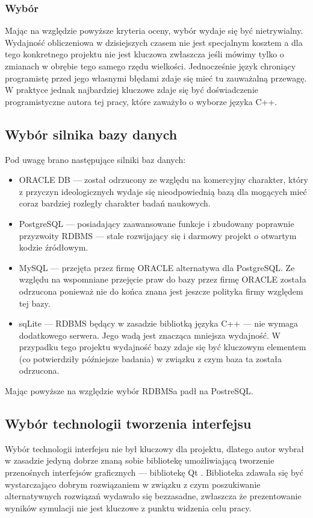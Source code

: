 {\subsubsection{Wybór}
\par{
Mając na względzie powyższe kryteria oceny, wybór wydaje się być nietrywialny. Wydajność obliczeniowa w dzisiejszych czasem nie jest specjalnym kosztem a dla tego konkretnego projektu nie jest kluczowa zwłaszcza jeśli mówimy tylko o zmianach w obrębie tego samego rzędu wielkości. Jednocześnie język chroniący programistę przed jego własnymi błędami zdaje się mieć tu zauważalną przewagę. W praktyce jednak najbardziej kluczowe zdaje się być doświadczenie programistyczne autora tej pracy, które zaważyło o wyborze języka C++.
}

\subsection{Wybór silnika bazy danych}
\par{
Pod uwagę brano następujące silniki baz danych:
\begin{itemize}
\item ORACLE DB --- został odrzucony ze względu na komercyjny charakter, który z przyczyn ideologicznych wydaje się nieodpowiednią bazą dla mogących mieć coraz bardziej rozległy charakter badań naukowych.
\item PostgreSQL --- posiadający zaawansowane funkcje i zbudowany poprawnie przyzwoity RDBMS --- stale rozwijający się i darmowy projekt o otwartym kodzie źródłowym.
\item MySQL --- przejęta przez firmę ORACLE alternatywa dla PostgreSQL. Ze względu na wspomniane przejęcie praw do bazy przez firmę ORACLE została odrzucona ponieważ nie do końca znana jest jeszcze polityka firmy względem tej bazy.
\item sqLite --- RDBMS będący w zasadzie bibliotką języka C++ --- nie wymaga dodatkowego serwera. Jego wadą jest znacząca mniejsza wydajność. W przypadku tego projektu wydajność bazy zdaje się być kluczowym elementem (co potwierdziły późniejsze badania) w związku z czym baza ta została odrzucona.
\end{itemize}
Mając powyższe na względzie wybór RDBMSa padł na PostreSQL.
}

\subsection{Wybór technologii tworzenia interfejsu}
\par{
Wybór technologii interfejsu nie był kluczowy dla projektu, dlatego autor wybrał w zasadzie jedyną dobrze znaną sobie bibliotekę umożliwiającą tworzenie przenośnych interfejsów graficznych --- bibliotekę Qt \cite{Qt}. Biblioteka zdawała się być wystarczająco dobrym rozwiązaniem w związku z czym poszukiwanie alternatywnych rozwiązań wydawało się bezzasadne, zwłaszcza że prezentowanie wyników symulacji nie jest kluczowe z punktu widzenia celu pracy.
}

}
